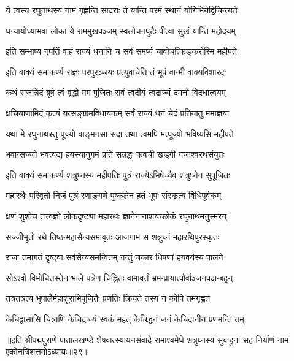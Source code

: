 \twolineshloka
{ये त्वस्य रघुनाथस्य नाम गृह्णन्ति सादराः}
{ते यान्ति परमं स्थानं योगिभिर्यद्विचिन्त्यते}%

\twolineshloka
{धन्यायोध्याभवा लोका ये राममुखपञ्जम्}
{स्वलोचनपुटैः पीत्वा सुखं यान्ति महोदयम्}%

\twolineshloka
{इति सम्भाष्य नृपतिं वाहं राज्यं धनानि च}
{सर्वं समर्प्य चावोचत्किङ्करोस्मि महीपते}%

\twolineshloka
{इति वाक्यं समाकर्ण्य राज्ञः परपुरञ्जयः}
{प्रत्युवाचेति तं भूपं वाग्मी वाक्यविशारदः}%


\twolineshloka
{कथं राजन्निदं ब्रूषे त्वं वृद्धो मम पूजितः}
{सर्वं त्वदीयं त्वद्राज्यं दमनो विदधात्वयम्}%

\twolineshloka
{क्षत्त्रियाणामिदं कृत्यं यत्सङ्ग्रामविधायकम्}
{सर्वं राज्यं धनं चेदं प्रतियातु ममाज्ञया}%

\twolineshloka
{यथा मे रघुनाथस्तु पूज्यो वाङ्मनसा सदा}
{तथा त्वमपि मत्पूज्यो भविष्यसि महीपते}%

\twolineshloka
{भवान्सज्जो भवत्वद्य हयस्यानुगमं प्रति}
{सन्नद्धः कवची खड्गी गजाश्वरथसंयुतः}%

\twolineshloka
{इति वाक्यं समाकर्ण्य शत्रुघ्नस्य महीपतिः}
{पुत्रं राज्येऽभिषेच्यैव शत्रुघ्नेन सुपूजितः}%

\twolineshloka
{महारथैः परिवृतो निजं पुत्रं रणाङ्गणे}
{पुष्कलेन हतं भूपः संस्कृत्य विधिपूर्वकम्}%

\twolineshloka
{क्षणं शुशोच तत्त्वज्ञो लोकदृष्ट्या महारथः}
{ज्ञानेनानाशयच्छोकं रघुनाथमनुस्मरन्}%

\twolineshloka
{सज्जीभूतो रथे तिष्ठन्महासैन्यसमावृतः}
{आजगाम स शत्रुघ्नं महारथिपुरस्कृतः}%

\twolineshloka
{राजा तमागतं दृष्ट्वा सर्वसैन्यसमन्वितम्}
{गन्तुं चकार धिषणां हयवर्यस्य पालने}%

\twolineshloka
{सोऽश्वो विमोचितस्तेन भाले पत्रेण चिह्नितः}
{वामावर्तं भ्रमन्प्रायात्पौर्वाञ्जनपदान्बहून्}%

\twolineshloka
{तत्रतत्रत्य भूपालैर्महाशूराभिपूजितैः}
{प्रणतिः क्रियते तस्य न कोपि तमगृह्णत}%

\twolineshloka
{केचिद्वासांसि चित्राणि केचिद्राज्यं स्वकं महत्}
{केचिद्धनं जनं केचिदानीय प्रणमन्ति तम्}%

{॥इति श्रीपद्मपुराणे पातालखण्डे शेषवात्स्यायनसंवादे रामाश्वमेधे शत्रुघ्नस्य सुबाहुना सह निर्याणं नाम एकोनत्रिंशत्तमोऽध्यायः॥२९॥}



